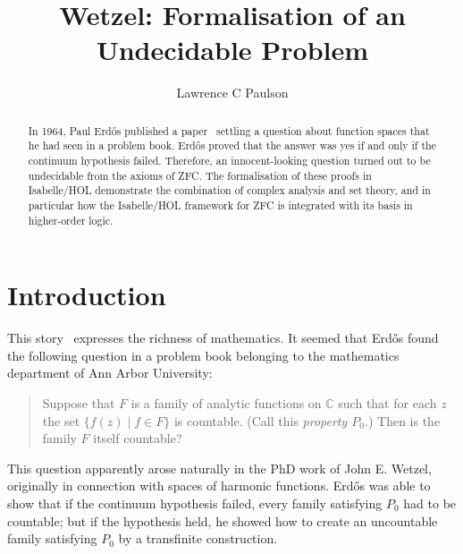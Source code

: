 \documentclass[runningheads]{llncs}
\begin{document}
%
\title{Wetzel: Formalisation of an Undecidable Problem}
%
%
\author{Lawrence C Paulson}
%
%
%
\maketitle              %
%
\begin{abstract}
In 1964, Paul Erd\H{o}s published a paper~\cite{erdos-interpolation} settling a question about function spaces that he had seen in a problem book.
Erd\H{o}s proved that the answer was yes if and only if the continuum hypothesis failed.
Therefore, an innocent-looking question turned out to be undecidable from the axioms of ZFC\@.
The formalisation of these proofs in Isabelle/HOL demonstrate the combination of complex analysis and set theory, and in particular how the Isabelle/HOL framework for ZFC is integrated with its basis in higher-order logic.
\end{abstract}


\section{Introduction}

This story~\cite{garcia-wetzels-problem} expresses the richness of mathematics.
It seemed that Erd\H{o}s found the following question in a problem book belonging to the mathematics department of Ann Arbor University:
\begin{quote}
Suppose that $F$ is a family of analytic functions on $\mathbb{C}$ such that for each $z$ the set $\{f (z)\mid f\in F\}$ is countable. (Call this \emph{property $P_0$}.) Then is the family $F$ itself countable?
\end{quote}
This question apparently arose naturally in the PhD work of John E. Wetzel, originally in connection with spaces of harmonic functions.
Erd\H{o}s was able to show that if the continuum hypothesis failed, every family satisfying $P_0$ had to be countable; but if the hypothesis held, he showed how to create an uncountable family satisfying $P_0$ by a transfinite construction.
\end{document}
